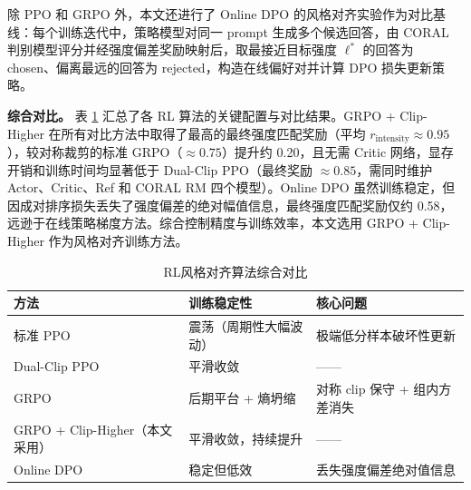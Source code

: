 \documentclass[fontset=fandol,type=master,campus=shenzhen,etitleauto=true]{hithesisbook}
\begin{document}
除 PPO 和 GRPO 外，本文还进行了 Online DPO 的风格对齐实验作为对比基线：每个训练迭代中，策略模型对同一 prompt 生成多个候选回答，由 CORAL 判别模型评分并经强度偏差奖励映射后，取最接近目标强度 $\ell^*$ 的回答为 chosen、偏离最远的回答为 rejected，构造在线偏好对并计算 DPO 损失更新策略。

\textbf{综合对比。} 表 \ref{tab:rl-comparison} 汇总了各 RL 算法的关键配置与对比结果。GRPO + Clip-Higher 在所有对比方法中取得了最高的最终强度匹配奖励（平均 $r_{\text{intensity}} \approx 0.95$），较对称裁剪的标准 GRPO（$\approx 0.75$）提升约 0.20，且无需 Critic 网络，显存开销和训练时间均显著低于 Dual-Clip PPO（最终奖励 $\approx 0.85$，需同时维护 Actor、Critic、Ref 和 CORAL RM 四个模型）。Online DPO 虽然训练稳定，但因成对排序损失丢失了强度偏差的绝对幅值信息，最终强度匹配奖励仅约 0.58，远逊于在线策略梯度方法。综合控制精度与训练效率，本文选用 GRPO + Clip-Higher 作为风格对齐训练方法。

\begin{table}[htbp]
\centering
\caption{RL风格对齐算法综合对比}
\label{tab:rl-comparison}
\small
\renewcommand{\arraystretch}{1.12}

\vspace{0.3cm}
\renewcommand{\arraystretch}{1.05}
\begin{tabular}{l p{3.5cm} p{5.0cm}}
\toprule
\textbf{方法} & \textbf{训练稳定性} & \textbf{核心问题} \\
\midrule
标准 PPO & 震荡（周期性大幅波动） & 极端低分样本破坏性更新 \\
Dual-Clip PPO & 平滑收敛 & —— \\
GRPO & 后期平台 + 熵坍缩 & 对称 clip 保守 + 组内方差消失 \\
GRPO + Clip-Higher（本文采用） & 平滑收敛，持续提升 & —— \\
Online DPO & 稳定但低效 & 丢失强度偏差绝对值信息 \\
\bottomrule
\end{tabular}
\end{table}
\end{document}
